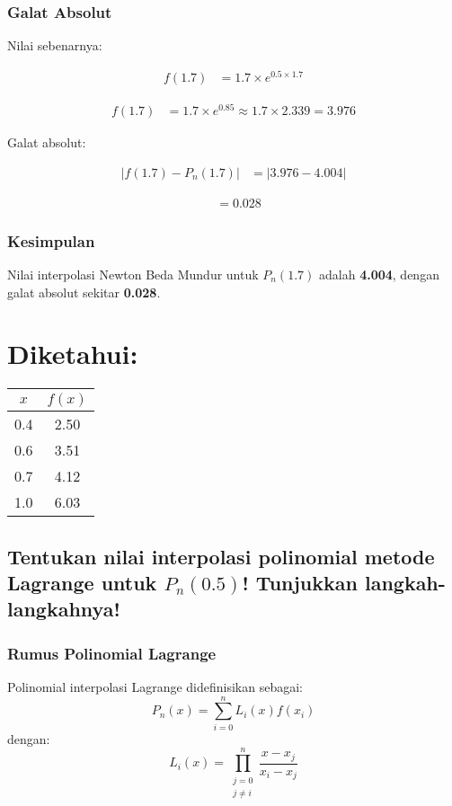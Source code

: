 \documentclass{article}
\begin{document}
\subsubsection{Galat Absolut}
Nilai sebenarnya:

\begin{align*}
    f(1.7) &= 1.7 \times e^{0.5 \times 1.7}
\end{align*}

\begin{align*}
    f(1.7) &= 1.7 \times e^{0.85} \approx 1.7 \times 2.339 = 3.976
\end{align*}

Galat absolut:

\begin{align*}
    | f(1.7) - P_n(1.7) | &= | 3.976 - 4.004 |
\end{align*}

\begin{align*}
    &= 0.028
\end{align*}

\subsubsection{Kesimpulan}
Nilai interpolasi Newton Beda Mundur untuk $P_n(1.7)$ adalah \textbf{4.004}, dengan galat absolut sekitar \textbf{0.028}.

\section{Diketahui:}
\begin{center}
\begin{tabular}{|c|c|}
    \hline
    $x$ & $f(x)$ \\
    \hline
    0.4 & 2.50 \\
    0.6 & 3.51 \\
    0.7 & 4.12 \\
    1.0 & 6.03 \\
    \hline
\end{tabular}
\end{center}

\subsection{Tentukan nilai interpolasi polinomial metode Lagrange untuk $P_n(0.5)$! Tunjukkan
langkah-langkahnya!}

\subsubsection{Rumus Polinomial Lagrange}
Polinomial interpolasi Lagrange didefinisikan sebagai:
\[
P_n(x) = \sum_{i=0}^{n} L_i(x) f(x_i)
\]
dengan:
\[
L_i(x) = \prod_{\substack{j=0 \\ j\neq i}}^{n} \frac{x - x_j}{x_i - x_j}
\]
\end{document}

